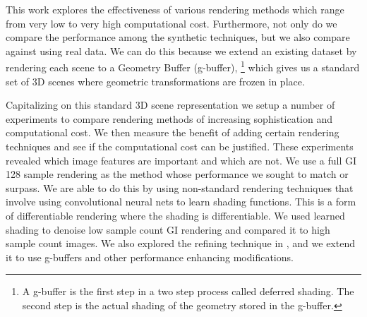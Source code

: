 \documentclass[10pt,twocolumn,letterpaper]{article}
\begin{document}
This work explores the effectiveness of various rendering methods which range from very low to very high computational cost.   Furthermore, not only do we compare the performance among the synthetic techniques, but we also compare against using real data.  We can do this because we extend an existing dataset by rendering each scene to a Geometry Buffer (g-buffer),  \footnote{A g-buffer is the first step in a two step process called deferred shading. The second step is the actual shading of the geometry stored in the g-buffer.} which gives us a standard set of 3D scenes where geometric transformations are frozen in place.



Capitalizing on this standard 3D scene representation we setup a number of experiments to compare rendering methods of increasing sophistication and computational cost.  We then measure the benefit of adding certain rendering techniques and see if the computational cost can be justified.  These experiments revealed which image features are important and which are not.  We use a full GI 128 sample rendering as the method whose performance we sought to match or surpass.  We are able to do this by using non-standard rendering techniques that involve using convolutional neural nets to learn shading functions.  This is a form of differentiable rendering where the shading is differentiable. We used learned shading to denoise low sample count GI rendering and compared it to high sample count images.  We also explored the refining technique in \cite{DBLP:journals/corr/ShrivastavaPTSW16},  and we extend it to use g-buffers and other performance enhancing modifications.
\end{document}
